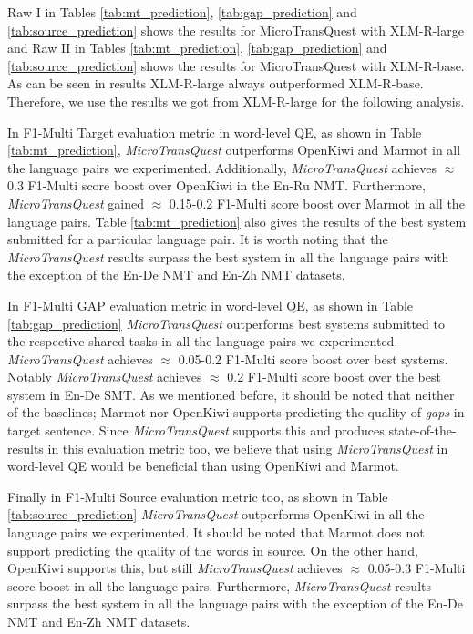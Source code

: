  Raw I in Tables \ref{tab:mt_prediction}, \ref{tab:gap_prediction} and \ref{tab:source_prediction} shows the results for MicroTransQuest with XLM-R-large and Raw II in Tables  \ref{tab:mt_prediction}, \ref{tab:gap_prediction} and \ref{tab:source_prediction} shows the results for MicroTransQuest with XLM-R-base. As can be seen in results XLM-R-large always outperformed XLM-R-base. Therefore, we use the results we got from XLM-R-large for the following analysis.
 
 In F1-Multi Target evaluation metric in word-level QE, as shown in Table \ref{tab:mt_prediction}, \textit{MicroTransQuest} outperforms OpenKiwi and Marmot in all the language pairs we experimented. Additionally, \textit{MicroTransQuest} achieves $\approx$ 0.3 F1-Multi score boost over OpenKiwi in the En-Ru NMT. Furthermore, \textit{MicroTransQuest} gained $\approx$ 0.15-0.2 F1-Multi score boost over Marmot in all the language pairs. Table \ref{tab:mt_prediction}  also gives the results of the best system submitted for a particular language pair. It is worth noting that the \textit{MicroTransQuest} results surpass the best system in all the language pairs with the exception of the En-De NMT and En-Zh NMT datasets.
 
 In F1-Multi GAP evaluation metric in word-level QE, as shown in Table \ref{tab:gap_prediction} \textit{MicroTransQuest} outperforms best systems submitted to the respective shared tasks in all the language pairs we experimented. \textit{MicroTransQuest} achieves $\approx$ 0.05-0.2 F1-Multi score boost over best systems. Notably \textit{MicroTransQuest} achieves $\approx$ 0.2 F1-Multi score boost over the best system in En-De SMT. As we mentioned before, it should be noted that neither of the baselines; Marmot nor OpenKiwi supports predicting the quality of \textit{gaps} in target sentence. Since \textit{MicroTransQuest} supports this and produces state-of-the-results in this evaluation metric too, we believe that using \textit{MicroTransQuest} in word-level QE would be beneficial than using OpenKiwi and Marmot.
 
Finally in F1-Multi Source evaluation metric too, as shown in Table \ref{tab:source_prediction} \textit{MicroTransQuest} outperforms OpenKiwi in all the language pairs we experimented. It should be noted that Marmot does not support predicting the quality of the words in source. On the other hand, OpenKiwi supports this, but still \textit{MicroTransQuest} achieves $\approx$ 0.05-0.3 F1-Multi score boost in all the language pairs. Furthermore, \textit{MicroTransQuest} results surpass the best system in all the language pairs with the exception of the En-De NMT and En-Zh NMT datasets.

